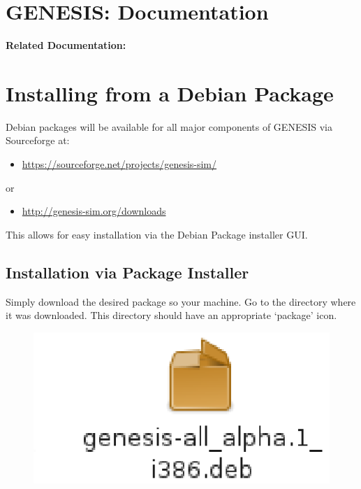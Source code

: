 \documentclass[12pt]{article}
\begin{document}
\section*{GENESIS: Documentation}

{\bf Related Documentation:}

\section*{Installing from a Debian Package}

Debian packages will be available for all major components of GENESIS via Sourceforge at:
\begin{itemize}
   \item[]\href{https://sourceforge.net/projects/genesis-sim/}{https://sourceforge.net/projects/genesis-sim/}
\end{itemize}
\noindent or
\begin{itemize}
   \item[]\href{http://genesis-sim.org/downloads}{http://genesis-sim.org/downloads}
\end{itemize}
This allows for easy installation via the Debian Package installer GUI.

\subsection*{Installation via Package Installer}

Simply download the desired package so your machine. Go to the directory where it was downloaded. This directory should have an appropriate `package' icon.

\begin{figure}[h]
   \centering
   \includegraphics[scale=1]{figures/install-user-deb-icon.eps}
\end{figure}
\end{document}
